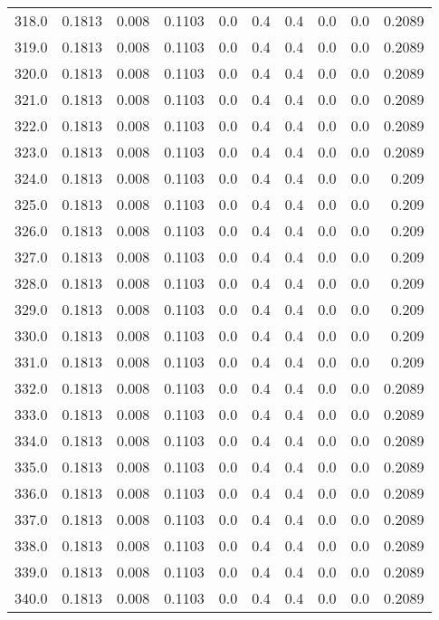 \begin{longtable}{lrrrrrrrrr}
318.0 & 0.1813 & 0.008 & 0.1103 & 0.0 & 0.4 & 0.4 & 0.0 & 0.0 & 0.2089 \\
319.0 & 0.1813 & 0.008 & 0.1103 & 0.0 & 0.4 & 0.4 & 0.0 & 0.0 & 0.2089 \\
320.0 & 0.1813 & 0.008 & 0.1103 & 0.0 & 0.4 & 0.4 & 0.0 & 0.0 & 0.2089 \\
321.0 & 0.1813 & 0.008 & 0.1103 & 0.0 & 0.4 & 0.4 & 0.0 & 0.0 & 0.2089 \\
322.0 & 0.1813 & 0.008 & 0.1103 & 0.0 & 0.4 & 0.4 & 0.0 & 0.0 & 0.2089 \\
323.0 & 0.1813 & 0.008 & 0.1103 & 0.0 & 0.4 & 0.4 & 0.0 & 0.0 & 0.2089 \\
324.0 & 0.1813 & 0.008 & 0.1103 & 0.0 & 0.4 & 0.4 & 0.0 & 0.0 & 0.209 \\
325.0 & 0.1813 & 0.008 & 0.1103 & 0.0 & 0.4 & 0.4 & 0.0 & 0.0 & 0.209 \\
326.0 & 0.1813 & 0.008 & 0.1103 & 0.0 & 0.4 & 0.4 & 0.0 & 0.0 & 0.209 \\
327.0 & 0.1813 & 0.008 & 0.1103 & 0.0 & 0.4 & 0.4 & 0.0 & 0.0 & 0.209 \\
328.0 & 0.1813 & 0.008 & 0.1103 & 0.0 & 0.4 & 0.4 & 0.0 & 0.0 & 0.209 \\
329.0 & 0.1813 & 0.008 & 0.1103 & 0.0 & 0.4 & 0.4 & 0.0 & 0.0 & 0.209 \\
330.0 & 0.1813 & 0.008 & 0.1103 & 0.0 & 0.4 & 0.4 & 0.0 & 0.0 & 0.209 \\
331.0 & 0.1813 & 0.008 & 0.1103 & 0.0 & 0.4 & 0.4 & 0.0 & 0.0 & 0.209 \\
332.0 & 0.1813 & 0.008 & 0.1103 & 0.0 & 0.4 & 0.4 & 0.0 & 0.0 & 0.2089 \\
333.0 & 0.1813 & 0.008 & 0.1103 & 0.0 & 0.4 & 0.4 & 0.0 & 0.0 & 0.2089 \\
334.0 & 0.1813 & 0.008 & 0.1103 & 0.0 & 0.4 & 0.4 & 0.0 & 0.0 & 0.2089 \\
335.0 & 0.1813 & 0.008 & 0.1103 & 0.0 & 0.4 & 0.4 & 0.0 & 0.0 & 0.2089 \\
336.0 & 0.1813 & 0.008 & 0.1103 & 0.0 & 0.4 & 0.4 & 0.0 & 0.0 & 0.2089 \\
337.0 & 0.1813 & 0.008 & 0.1103 & 0.0 & 0.4 & 0.4 & 0.0 & 0.0 & 0.2089 \\
338.0 & 0.1813 & 0.008 & 0.1103 & 0.0 & 0.4 & 0.4 & 0.0 & 0.0 & 0.2089 \\
339.0 & 0.1813 & 0.008 & 0.1103 & 0.0 & 0.4 & 0.4 & 0.0 & 0.0 & 0.2089 \\
340.0 & 0.1813 & 0.008 & 0.1103 & 0.0 & 0.4 & 0.4 & 0.0 & 0.0 & 0.2089 \\

\end{longtable}
